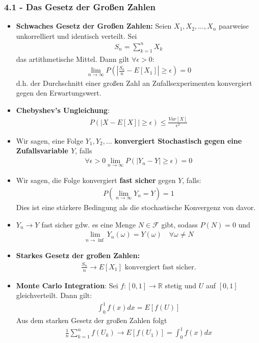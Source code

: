 \documentclass{scrartcl}
\newcommand{\mc}[1]{\mathcal{#1}}
\newcommand{\real}{\mathbb{R}}
\begin{document}
\subsubsection*{4.1 - Das Gesetz der Großen Zahlen}
\begin{itemize}
    \item \textbf{Schwaches Gesetz der Großen Zahlen:} Seien $X_1, X_2, \hdots, X_n$ paarweise unkorrelliert und identisch verteilt. Sei
    \begin{align*}
        S_n = \sum_{k=1}^n X_k
    \end{align*}
    das artithmetische Mittel. Dann gilt $\forall \epsilon > 0$:
    \begin{align*}
        \lim_{n \to \infty}P(|\frac{S_n}{n} - E[X_1]| \geq \epsilon) = 0 
    \end{align*}
    d.h. der Durchschnitt einer großen Zahl an Zufallsexperimenten konvergiert gegen den Erwartungswert.
    \item \textbf{Chebyshev's Ungleichung}:
    \begin{align*}
        P(|X - E[X]| \geq \epsilon) \leq \frac{Var[X]}{\epsilon^2}
    \end{align*}
    \item Wir sagen, eine Folge $Y_1, Y_2, \hdots$ \textbf{konvergiert Stochastisch gegen eine Zufallsvariable $Y$}, falls
    \begin{align*}
        \forall \epsilon > 0 \lim_{n \to \infty} P(|Y_n - Y| \geq \epsilon) = 0
    \end{align*}
    \item Wir sagen, die Folge konvergiert \textbf{fast sicher} gegen $Y$, falls:
    \begin{align*}
        P(\lim_{n \to \infty} Y_n = Y) = 1
    \end{align*}
    Dies ist eine stärkere Bedingung als die stochastische Konvergenz von davor.
    \item $Y_n \to Y$ fast sicher gdw. es eine Menge $N \in \mc{F}$ gibt, sodass $P(N) = 0$ und
    \begin{align*}
        \lim_{n \to \inf} Y_n(\omega) = Y(\omega)\quad \forall \omega \neq N
    \end{align*}
    \item \textbf{Starkes Gesetz der großen Zahlen:}
    \begin{align*}
        \frac{S_n}{n} \to E[X_1] \text{ konvergiert fast sicher.}
    \end{align*}
    \item \textbf{Monte Carlo Integration}: Sei $f: [0,1] \to \real$ stetig und $U$ auf $[0,1]$ gleichverteilt. Dann gilt:
    \begin{align*}
        \int_0^1 f(x)dx = E[f(U)]
    \end{align*}
    Aus dem starken Gesetz der großen Zahlen folgt
    \begin{align*}
        \frac{1}{n}\sum_{k=1}^n f(U_k) \to E[f(U_1)] = \int_0^1 f(x)dx
    \end{align*}
\end{itemize}
\end{document}
